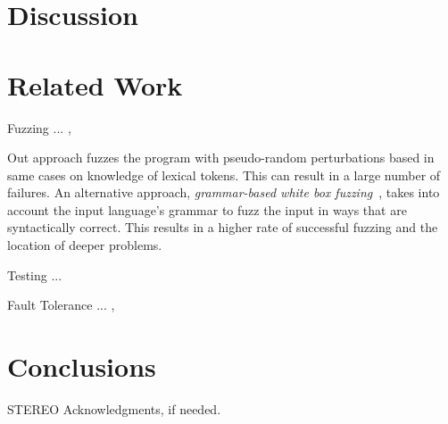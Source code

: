 \documentclass[10pt]{sigplanconf}
\begin{document}

\section{Discussion} %

\section{Related Work} %

Fuzzing ... \cite{TJC08}, \cite{WWGZ11}

Out approach fuzzes the program with pseudo-random
perturbations based in same cases on knowledge of
lexical tokens.
This can result in a large number of failures.
An alternative approach, {\em grammar-based white box fuzzing}~\cite{Cog08},
takes into account the input language's grammar to fuzz the input in
ways that are syntactically correct.
This results in a higher rate of successful fuzzing and the location
of deeper problems.

Testing ... \cite{HAM06}

Fault Tolerance ... \cite{KOKR07}, \cite{LYU95}

\section{Conclusions} %

\acks

STEREO
Acknowledgments, if needed.








\end{document}
